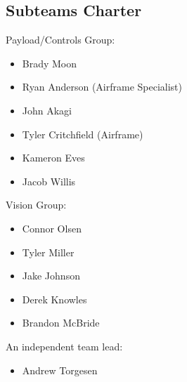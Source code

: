 \documentclass[]{../auvsi_doc}
\begin{document}
\begin{appendices}

\section{Subteams Charter}
\label{appendix:subteamscharter}

Payload/Controls Group:
\begin{itemize}
\item Brady Moon
\item Ryan Anderson (Airframe Specialist)
\item John Akagi
\item Tyler Critchfield (Airframe)
\item Kameron Eves
\item Jacob Willis
\end{itemize}
Vision Group:
\begin{itemize}
\item Connor Olsen
\item Tyler Miller
\item Jake Johnson
\item Derek Knowles
\item Brandon McBride
\end{itemize}
An independent team lead:
\begin{itemize}
\item Andrew Torgesen
\end{itemize}

\end{appendices}
\end{document}
